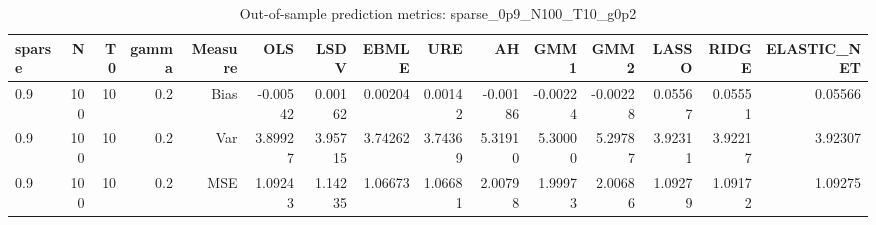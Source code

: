 \begin{table}[!htbp]\centering
\caption{Out-of-sample prediction metrics: sparse_0p9_N100_T10_g0p2}
\label{tab:table3_sparse_0p9_N100_T10_g0p2}
\begin{tabular}{lrrrrrrrrrrrrrr}
\hline
sparse & N & T0 & gamma & Measure & OLS & LSDV & EBMLE & URE & AH & GMM1 & GMM2 & LASSO & RIDGE & ELASTIC_NET \\
\hline
0.9 & 100 & 10 & 0.2 & Bias & -0.00542 & 0.00162 & 0.00204 & 0.00142 & -0.00186 & -0.00224 & -0.00228 & 0.05567 & 0.05551 & 0.05566 \\
0.9 & 100 & 10 & 0.2 & Var & 3.89927 & 3.95715 & 3.74262 & 3.74369 & 5.31910 & 5.30000 & 5.29787 & 3.92311 & 3.92217 & 3.92307 \\
0.9 & 100 & 10 & 0.2 & MSE & 1.09243 & 1.14235 & 1.06673 & 1.06681 & 2.00798 & 1.99973 & 2.00686 & 1.09279 & 1.09172 & 1.09275 \\
\hline
\end{tabular}
\end{table}

